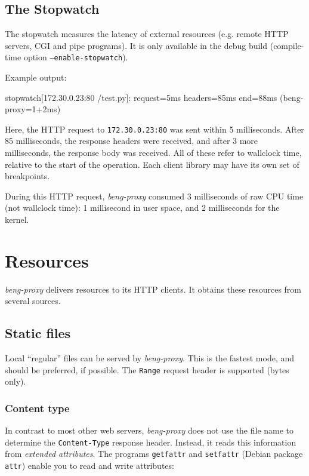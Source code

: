 \documentclass[a4paper,12pt]{article}
\begin{document}
\subsection{The Stopwatch}
\label{stopwatch}

The stopwatch measures the latency of external resources (e.g. remote
HTTP servers, CGI and pipe programs).  It is only available in the
debug build (compile-time option \texttt{--enable-stopwatch}).

Example output:

\begin{verbatim*}
stopwatch[172.30.0.23:80 /test.py]: request=5ms headers=85ms
end=88ms (beng-proxy=1+2ms)
\end{verbatim*}

Here, the HTTP request to \texttt{172.30.0.23:80} was sent within 5
milliseconds.  After 85 milliseconds, the response headers were
received, and after 3 more milliseconds, the response body was
received.  All of these refer to wallclock time, relative to the start
of the operation.  Each client library may have its own set of
breakpoints.

During this HTTP request, \emph{beng-proxy} consumed 3 milliseconds of
raw CPU time (not wallclock time): 1 millisecond in user space, and 2
milliseconds for the kernel.

\section{Resources}

\emph{beng-proxy} delivers resources to its HTTP clients.  It obtains
these resources from several sources.

\subsection{Static files}
\label{static}

Local ``regular'' files can be served by \emph{beng-proxy}.  This is
the fastest mode, and should be preferred, if possible.  The
\texttt{Range} request header is supported (bytes only).

\subsubsection{Content type}

\label{xattr}

In contrast to most other web servers, \emph{beng-proxy} does not use
the file name to determine the \texttt{Content-Type} response header.
Instead, it reads this information from \textit{extended attributes}.
The programs \texttt{getfattr} and \texttt{setfattr} (Debian package
\texttt{attr}) enable you to read and write attributes:
\end{document}
